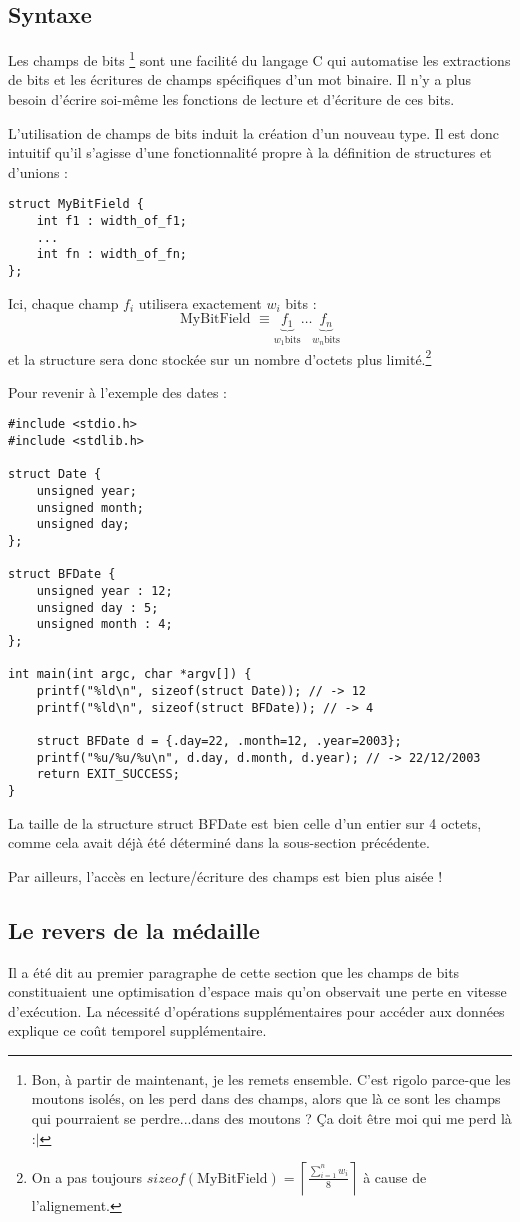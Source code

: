 \documentclass[../../../main.tex]{subfiles}
\begin{document}
\subsection{Syntaxe}
Les champs de bits \footnote{Bon, à partir de maintenant, je les remets ensemble. C'est rigolo parce-que les moutons isolés, on les perd dans des champs, alors que là ce sont les champs qui pourraient se perdre...dans des moutons ? Ça doit être moi qui me perd là :$|$} sont une facilité du langage C qui automatise les extractions de bits et les écritures
de champs spécifiques d'un mot binaire. Il n'y a plus besoin d'écrire soi-même les fonctions de lecture
et d'écriture de ces bits.

L'utilisation de champs de bits induit la création d'un nouveau type. Il est donc intuitif qu'il s'agisse d'une fonctionnalité propre à la définition de structures et d'unions :
\begin{verbatim}
struct MyBitField {
	int f1 : width_of_f1;
	...
	int fn : width_of_fn;
};
\end{verbatim}
Ici, chaque champ $f_{i}$ utilisera exactement $w_{i}$ bits :
$$\text{MyBitField }\equiv \underbrace{f_{1}}_{w_{1} \text{bits}}\dots \underbrace{f_{n}}_{w_{n} \text{bits}}$$
et la structure sera donc stockée sur un nombre d'octets plus limité.\footnote{On a pas toujours $sizeof(\text{MyBitField}) = \displaystyle\left\lceil\frac{\sum_{i= 1}^{n}w_{i}}{8}\right\rceil$ à cause de l'alignement.}

Pour revenir à l'exemple des dates :
\begin{verbatim}
#include <stdio.h>
#include <stdlib.h>

struct Date {
	unsigned year;
	unsigned month;
	unsigned day;
};

struct BFDate {
	unsigned year : 12;
	unsigned day : 5;
	unsigned month : 4;
};

int main(int argc, char *argv[]) {
	printf("%ld\n", sizeof(struct Date)); // -> 12
	printf("%ld\n", sizeof(struct BFDate)); // -> 4

	struct BFDate d = {.day=22, .month=12, .year=2003};
	printf("%u/%u/%u\n", d.day, d.month, d.year); // -> 22/12/2003
	return EXIT_SUCCESS;
}
\end{verbatim}
La taille de la structure \textsf{struct BFDate} est bien celle d'un entier sur 4 octets, comme cela avait déjà été déterminé dans la sous-section précédente.

Par ailleurs, l'accès en lecture/écriture des champs est bien plus aisée !
\subsection{Le revers de la médaille}
Il a été dit au premier paragraphe de cette section que les champs de bits constituaient une optimisation d'espace mais qu'on observait une perte en vitesse d'exécution. La nécessité d'opérations supplémentaires pour accéder aux données explique ce coût temporel supplémentaire.
\end{document}

